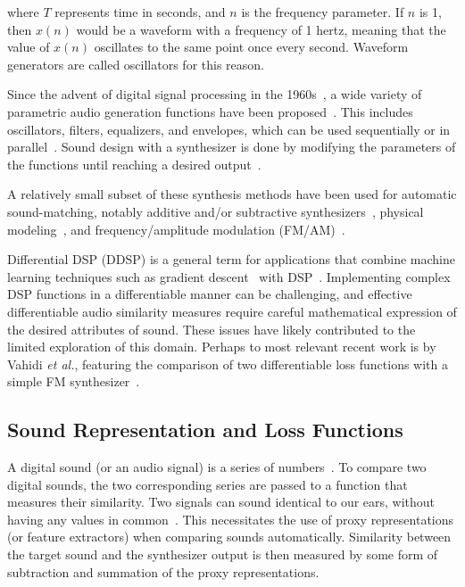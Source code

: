 \documentclass[lettersize,journal]{IEEEtran}
\providecommand{\gls}[1]{#1}
\begin{document}
where $T$ represents time in seconds, and $n$ is the frequency parameter. If $n$ is 1, then $x(n)$ would be a waveform with a frequency of 1 hertz, meaning that the value of $x(n)$ oscillates to the same point once every second. Waveform generators are called oscillators for this reason. 


Since the advent of digital signal processing in the 1960s~\cite{stranneby2004digital}, a wide variety of parametric audio generation functions have been proposed~\cite{lyons1997understanding,russ1999sound,shier2020spiegelib}. This includes oscillators, filters, equalizers, and envelopes, which can be used sequentially or in parallel~\cite{lyons1997understanding,russ1999sound}.  Sound design with a synthesizer is done by modifying the parameters of the functions until reaching a desired output~\cite{roads1996computer,pinch2004analog}.  

A relatively small subset of these synthesis methods have been used for automatic sound-matching, notably additive and/or subtractive synthesizers~\cite{esling2019flow,yee2018automatic,mitchell2007evolutionary,salimi2020make}, physical modeling~\cite{riionheimo2003parameter}, and frequency/amplitude modulation (\gls{FM}/\gls{AM})~\cite{horner1993machine,vahidi2023mesostructures}. 

Differential DSP (\gls{DDSP}) is a general term for applications that combine machine learning techniques such as gradient descent~\cite{goodfellow2016deep,boyd2004convex} with DSP~\cite{engel2020ddsp}. Implementing complex DSP functions in a differentiable manner can be challenging, and effective differentiable audio similarity measures require careful mathematical expression of the desired attributes of sound. These issues have likely contributed to the limited exploration of this domain. Perhaps to most relevant recent work is by Vahidi \textit{et al.}, featuring the comparison of two differentiable loss functions with a simple FM synthesizer~\cite{vahidi2023mesostructures}. 

\subsection{Sound Representation and Loss Functions}
\label{sec:loss_funcs}
A digital sound (or an audio signal) is a series of numbers~\cite{smith1991viewpoints,smith2007mathematics}. To compare two digital sounds, the two corresponding series are passed to a function that measures their similarity. Two signals can sound identical to our ears, without having any values in common~\cite{moore2012introduction}. This necessitates the use of proxy representations (or feature extractors) when comparing sounds automatically. Similarity between the target sound and the synthesizer output is then measured by some form of subtraction and summation of the proxy representations.
\end{document}
